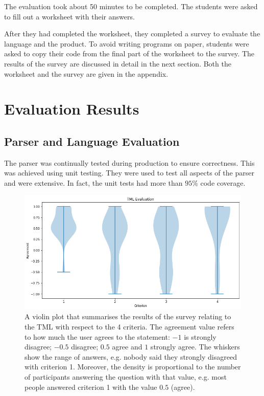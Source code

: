 The evaluation took about 50 minutes to be completed. The students were asked to fill out a worksheet with their answers. 

After they had completed the worksheet, they completed a survey to evaluate the language and the product. To avoid writing programs on paper, students were asked to copy their code from the final part of the worksheet to the survey. The results of the survey are discussed in detail in the next section. Both the worksheet and the survey are given in the appendix. 

\section{Evaluation Results}
\subsection{Parser and Language Evaluation}
The parser was continually tested during production to ensure correctness. This was achieved using unit testing. They were used to test all aspects of the parser and were extensive. In fact, the unit tests had more than $95\%$ code coverage.

\begin{figure}[htb]
    \centering
    \includegraphics[scale=0.35]{images/tml-evaluation.png}
    \caption{A violin plot that summarises the results of the survey relating to the TML with respect to the 4 criteria. The agreement value refers to how much the user agrees to the statement: $-1$ is strongly disagree; $-0.5$ disagree; $0.5$ agree and $1$ strongly agree. The whiskers show the range of answers, e.g. nobody said they strongly disagreed with criterion 1. Moreover, the density is proportional to the number of participants answering the question with that value, e.g. most people answered criterion 1 with the value $0.5$ (agree).}
    \label{fig:tml-evaluation}
\end{figure}

